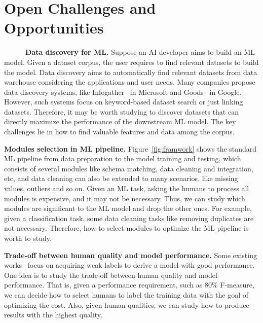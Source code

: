 \section{Open Challenges and Opportunities}
\label{sec:future}


~~~~~~\textbf{Data discovery for ML.} Suppose an AI developer aims to build an ML model. Given a dataset corpus, the user requires to find relevant datasets to build the model. Data discovery aims to automatically find relevant datasets from data warehouse considering the applications and user needs. Many companies propose data discovery systems, like Infogather~\cite{DBLP:conf/sigmod/YakoutGCC12} in Microsoft and Goods~\cite{DBLP:conf/sigmod/HalevyKNOPRW16} in Google. However,  such systems focus on keyword-based dataset search or just linking datasets. Therefore, it may be  worth studying to discover datasets that  can directly maximize the performance of the downstream ML model. The key challenges lie in how to find valuable features and data among the corpus.


\textbf{Modules selection in ML pipeline.}
Figure~\ref{fig:framwork} shows the standard ML pipeline from data preparation to the model training and testing, which consists of several modules like schema matching, data cleaning and integration, etc, and data cleaning can also be extended to many scenarios, like missing values, outliers and so on. Given an ML task, asking the humans to process all  modules is expensive, and it may not be necessary. Thus, we can study which modules are significant to the ML model and drop the other ones. For example, given a classification task, some data cleaning tasks like removing duplicates are not necessary. Therefore, how to select modules to optimize the ML pipeline is worth to study.


\textbf{Trade-off between human quality and model performance.}
Some existing works~\cite{DBLP:journals/vldb/RatnerBEFWR20, DBLP:conf/aaai/MitchellCHTBCMG15, DBLP:conf/acl/MintzBSJ09} focus on  acquiring weak labels to derive a model with good performance. One idea is to study the trade-off between human quality and model performance. That is, given a performance requirement, such as 80\% F-measure, we can decide how to  select humans to label the training data with the goal of optimizing the cost. Also, given human qualities, we can study how to produce results with the highest quality. 




